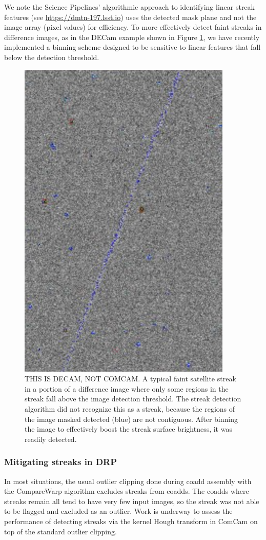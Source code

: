 We note the Science Pipelines' algorithmic approach to identifying linear streak features  (see \url{https://dmtn-197.lsst.io}) uses the detected mask plane and not the image array (pixel values) for efficiency. To more effectively detect faint streaks in difference images, as in the DECam example shown in Figure \ref{fig:decam-streak}, we have recently implemented a binning scheme designed to be sensitive to linear features that fall below the detection threshold.

\begin{figure}[ht!]
    \centering
    \includegraphics[width=0.5\linewidth]{dia/figures/decam-streak.png}
    \caption{THIS IS DECAM, NOT COMCAM. A typical faint satellite streak in a portion of a difference image where only some regions in the streak fall above the image detection threshold. The streak detection algorithm did not recognize this as a streak, because the regions of the image masked detected (blue) are not contiguous. After binning the image to effectively boost the streak surface brightness, it was readily detected.}
    \label{fig:decam-streak}
\end{figure}

\subsubsection{Mitigating streaks in DRP}

In most situations, the usual outlier clipping done during coadd assembly with the CompareWarp algorithm excludes streaks from coadds. The coadds where streaks remain all tend to have very few input images, so the streak was not able to be flagged and excluded as an outlier. Work is underway to assess the performance of detecting streaks via the kernel Hough transform in ComCam on top of the standard outlier clipping.

